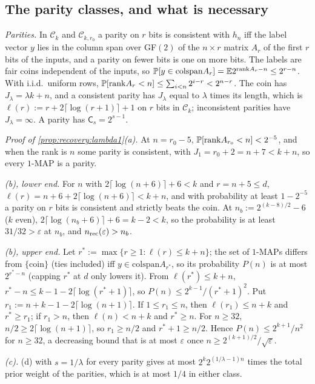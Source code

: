 \subsection{The parity classes, and what is necessary}\label{app:recovery:lambda1}

\emph{Parities.} In $\mathcal C_k$ and $\mathcal C_{k,r_0}$ a parity on $r$ bits is consistent with $h_n$ iff the label vector $y$ lies in the column span over GF$(2)$ of the $n\times r$ matrix $A_r$ of the first $r$ bits of the inputs, and a parity on fewer bits is one on more bits. The labels are fair coins independent of the inputs, so $\mathbb{P}[y\in\mathrm{colspan}A_r]=\mathbb{E}2^{\mathrm{rank}A_r-n}\le2^{r-n}$. With i.i.d.\ uniform rows, $\mathbb{P}[\mathrm{rank}A_r<n]\le\sum_{i<n}2^{i-r}<2^{n-r}$. The coin has $J_\lambda=\lambda k+n$, and a consistent parity has $J_\lambda$ equal to $\lambda$ times its length, which is $\ell(r):=r+2\lceil\log(r+1)\rceil+1$ on $r$ bits in $\mathcal C_k$; inconsistent parities have $J_\lambda=\infty$. A parity has $\mathsf C_s=2^{s-1}$.

\emph{Proof of \cref{prop:recovery:lambda1}(a).} At $n=r_0-5$, $\mathbb{P}[\mathrm{rank}A_{r_0}<n]<2^{-5}$, and when the rank is $n$ some parity is consistent, with $J_1=r_0+2=n+7<k+n$, so every $1$-MAP is a parity.

\emph{(b), lower end.} For $n$ with $2\lceil\log(n+6)\rceil+6<k$ and $r=n+5\le d$, $\ell(r)=n+6+2\lceil\log(n+6)\rceil<k+n$, and with probability at least $1-2^{-5}$ a parity on $r$ bits is consistent and strictly beats the coin. At $n_b:=2^{(k-8)/2}-6$ ($k$ even), $2\lceil\log(n_b+6)\rceil+6=k-2<k$, so the probability is at least $31/32>\varepsilon$ at $n_b$, and $n_{\rm rec}(\varepsilon)>n_b$.

\emph{(b), upper end.} Let $r^*:=\max\{r\ge1:\ell(r)\le k+n\}$; the set of $1$-MAPs differs from $\{\text{coin}\}$ (ties included) iff $y\in\mathrm{colspan}A_{r^*}$, so its probability $P(n)$ is at most $2^{r^*-n}$ (capping $r^*$ at $d$ only lowers it). From $\ell(r^*)\le k+n$, $r^*-n\le k-1-2\lceil\log(r^*+1)\rceil$, so $P(n)\le2^{k-1}/(r^*+1)^2$. Put $r_1:=n+k-1-2\lceil\log(n+1)\rceil$. If $1\le r_1\le n$, then $\ell(r_1)\le n+k$ and $r^*\ge r_1$; if $r_1>n$, then $\ell(n)<n+k$ and $r^*\ge n$. For $n\ge32$, $n/2\ge2\lceil\log(n+1)\rceil$, so $r_1\ge n/2$ and $r^*+1\ge n/2$. Hence $P(n)\le2^{k+1}/n^2$ for $n\ge32$, a decreasing bound that is at most $\varepsilon$ once $n\ge2^{(k+1)/2}/\sqrt\varepsilon$.

\emph{(c).} (d) with $s=1/\lambda$ for every parity gives at most $2^k2^{(1/\lambda-1)n}$ times the total prior weight of the parities, which is at most $1/4$ in either class.

